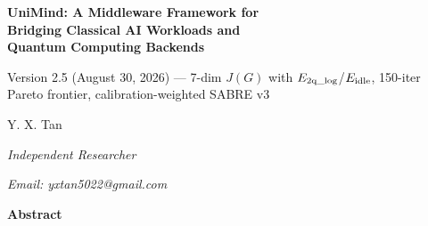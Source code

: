 ﻿\documentclass[12pt,a4paper]{article}
\begin{document}
\begin{titlepage}
\centering
\vspace*{2cm}

{\LARGE\bfseries UniMind: A Middleware Framework for\\[6pt]
Bridging Classical AI Workloads and\\[6pt]
Quantum Computing Backends\par}

\vspace{0.8cm}

{\normalsize\rmfamily Version 2.5 (August 30, 2026) --- 7-dim $J(G)$ with $E_{\rm 2q\_log}$/$E_{\rm idle}$, 150-iter Pareto frontier, calibration-weighted SABRE v3\par}

\vspace{1.2cm}

{\Large Y. X. Tan\par}
\vspace{0.3cm}
{\normalsize\itshape Independent Researcher\par}
{\normalsize\itshape Email: yxtan5022@gmail.com\par}

\vspace{1.8cm}

{\large\bfseries Abstract\par}
\vspace{0.5cm}


\end{titlepage}
\end{document}
